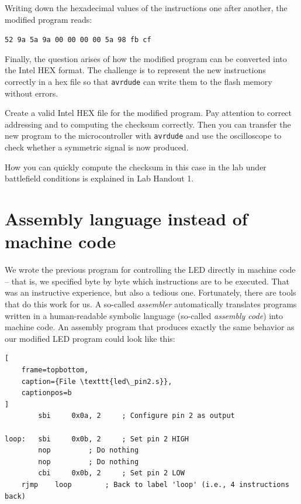 \documentclass[a4paper,12pt]{article}
\begin{document}
\noindent
Writing down the hexadecimal values of the instructions one after another,
the modified program reads:
\begin{center}
    \texttt{52 9a 5a 9a 00 00 00 00 5a 98 fb cf}
\end{center}

\noindent
Finally, the question arises of how the modified program can be converted
into the Intel HEX format. The challenge is to represent the new instructions
correctly in a hex file so that \texttt{avrdude} can write them to the flash
memory without errors.

\vspace{1em}
\vspace{16bp}
\begin{tcolorbox}[colback=myblue!5!white, colframe=myblue, title=Exercise]
    Create a valid Intel HEX file for the modified program. Pay attention to
    correct addressing and to computing the checksum correctly. Then you can
    transfer the new program to the microcontroller with \texttt{avrdude}
    and use the oscilloscope to check whether a symmetric signal is now
    produced.
\end{tcolorbox}

\medskip

\noindent
How you can quickly compute the checksum in this case in the lab under
battlefield conditions is explained in Lab Handout 1.

\section{Assembly language instead of machine code}
\label{sec:led_pin2}

We wrote the previous program for controlling the LED directly in machine
code – that is, we specified byte by byte which instructions are to be
executed. That was an instructive experience, but also a tedious one.
Fortunately, there are tools that do this work for us. A so-called
\emph{assembler} automatically translates programs written in a
human-readable symbolic language (so-called \emph{assembly code}) into
machine code. An assembly program that produces exactly the same behavior as
our modified LED program could look like this:

\begin{lstlisting}[
    frame=topbottom,
    caption={File \texttt{led\_pin2.s}},
    captionpos=b
]
        sbi     0x0a, 2     ; Configure pin 2 as output

loop:   sbi     0x0b, 2     ; Set pin 2 HIGH
        nop		    ; Do nothing
        nop		    ; Do nothing
        cbi     0x0b, 2     ; Set pin 2 LOW
	rjmp    loop        ; Back to label 'loop' (i.e., 4 instructions back)
\end{lstlisting}
\end{document}
